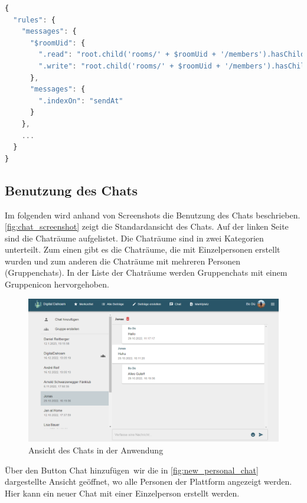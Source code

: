 \begin{lstlisting}[language=JavaScript, caption=Realtime DB Regeln für Chatnachrichten, label={lst:rules_realtime_db}]
{
  "rules": {
    "messages": {
      "$roomUid": {
        ".read": "root.child('rooms/' + $roomUid + '/members').hasChild(auth.uid)",
        ".write": "root.child('rooms/' + $roomUid + '/members').hasChild(auth.uid)"
      },
      "messages": {
        ".indexOn": "sendAt"
      }
    },
    ...
  }
}
\end{lstlisting}

\subsection{Benutzung des Chats}
\label{sec:benutzung_chat}

Im folgenden wird anhand von Screenshots die Benutzung des Chats beschrieben. \autoref{fig:chat_screenshot} zeigt die Standardansicht des Chats. Auf der linken Seite sind die Chaträume aufgelistet. Die Chaträume sind in zwei Kategorien unterteilt. Zum einen gibt es die Chaträume, die mit Einzelpersonen erstellt wurden und zum anderen die Chaträume mit mehreren Personen (Gruppenchats). In der Liste der Chaträume werden Gruppenchats mit einem Gruppenicon hervorgehoben.

\begin{figure}[!htb]
  \centering
  \includegraphics[width=1\textwidth]{figures/boas/21_chat.png}
  \caption[]{Ansicht des Chats in der Anwendung}
  \label{fig:chat_screenshot}
\end{figure}

Über den Button \glqq Chat hinzufügen\grqq \ wir die in \autoref{fig:new_personal_chat} dargestellte Ansicht geöffnet, wo alle Personen der Plattform angezeigt werden. Hier kann ein neuer Chat mit einer Einzelperson erstellt werden.

